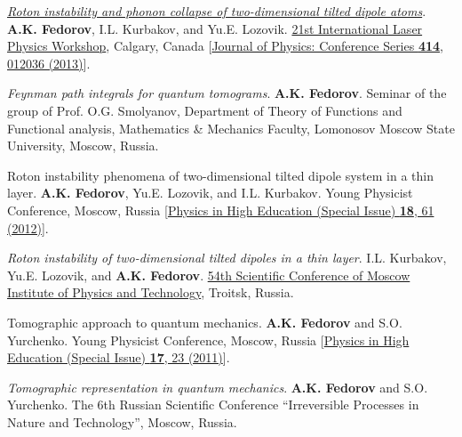 \documentclass[10pt,a4paper,sans]{moderncv}
\begin{document}
	{\textit{\textcolor{blue}{\href{http://dx.doi.org/10.1088/1742-6596/414/1/012036}{Roton instability and phonon collapse of two-dimensional tilted dipole atoms}}}.
	\textbf{A.K. Fedorov}, I.L. Kurbakov, and Yu.E. Lozovik.
	\textcolor{blue}{\href{http://www.lasphys.com/workshops/lasphys12/}{21st International Laser Physics Workshop}}, Calgary, Canada
	[\textcolor{blue}{\href{http://dx.doi.org/10.1088/1742-6596/414/1/012036}{Journal of Physics: Conference Series \textbf{414}, 012036 (2013)}}].}
	
	{\textit{Feynman path integrals for quantum tomograms}.
	\textbf{A.K. Fedorov}.
	Seminar of the group of Prof. O.G. Smolyanov,
	Department of Theory of Functions and Functional analysis, 
	Mathematics \& Mechanics Faculty, 
	Lomonosov Moscow State University, Moscow, Russia.}

	{Roton instability phenomena of two-dimensional tilted dipole system in a thin layer.
	\textbf{A.K. Fedorov}, Yu.E. Lozovik, and I.L. Kurbakov.
	Young Physicist Conference, Moscow, Russia
	[\textcolor{blue}{\href{http://konkmolphys.moomfo.ru/sites/default/files/1-2012_prilog.pdf}{Physics in High Education (Special Issue) \textbf{18}, 61 (2012)}}].}

	{\textit{Roton instability of two-dimensional tilted dipoles in a thin layer}.
	I.L. Kurbakov, Yu.E. Lozovik, and \textbf{A.K. Fedorov}.
	\textcolor{blue}{\href{http://mipt.ru/students/olympsaconfs/confmipt/f_5ykwxn/54conf.1/}{54th Scientific Conference of Moscow Institute of Physics and Technology}}, Troitsk, Russia.}
	
	{Tomographic approach to quantum mechanics.
	\textbf{A.K. Fedorov} and S.O. Yurchenko.
	Young Physicist Conference, Moscow, Russia
	[\textcolor{blue}{\href{http://konkmolphys.moomfo.ru/sites/default/files/1-2011_prilog.pdf}{Physics in High Education (Special Issue) \textbf{17}, 23 (2011)}}].}

	{\textit{Tomographic representation in quantum mechanics}.
	\textbf{A.K. Fedorov} and S.O. Yurchenko.
	The 6th Russian Scientific Conference ``Irreversible Processes in Nature and Technology'', 
	Moscow, Russia.}
	
\end{document}
